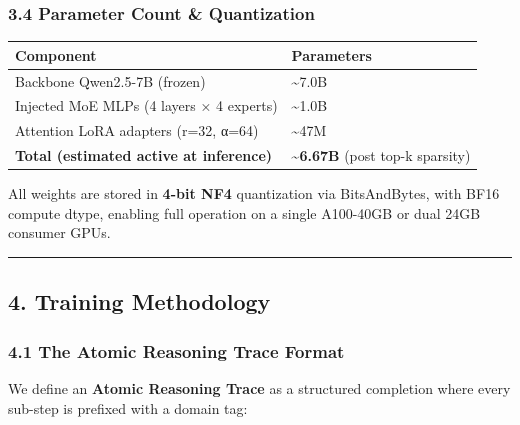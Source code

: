 \subsubsection{3.4 Parameter Count \&
Quantization}\label{parameter-count-quantization}

{\def\LTcaptype{none} %
\begin{longtable}[]{@{}
  >{\raggedright\arraybackslash}p{}
  >{\raggedright\arraybackslash}p{}@{}}
\toprule\noalign{}
\begin{minipage}[b]{\linewidth}\raggedright
Component
\end{minipage} & \begin{minipage}[b]{\linewidth}\raggedright
Parameters
\end{minipage} \\
\midrule\noalign{}
\endhead
\bottomrule\noalign{}
\endlastfoot
Backbone Qwen2.5-7B (frozen) & \textasciitilde7.0B \\
Injected MoE MLPs (4 layers × 4 experts) & \textasciitilde1.0B \\
Attention LoRA adapters (r=32, α=64) & \textasciitilde47M \\
\textbf{Total (estimated active at inference)} &
\textbf{\textasciitilde6.67B} (post top-k sparsity) \\
\end{longtable}
}

All weights are stored in \textbf{4-bit NF4} quantization via
BitsAndBytes, with BF16 compute dtype, enabling full operation on a
single A100-40GB or dual 24GB consumer GPUs.

\begin{center}\rule{0.5\linewidth}{0.5pt}\end{center}

\subsection{4. Training Methodology}\label{training-methodology}

\subsubsection{4.1 The Atomic Reasoning Trace
Format}\label{the-atomic-reasoning-trace-format}

We define an \textbf{Atomic Reasoning Trace} as a structured completion
where every sub-step is prefixed with a domain tag:

